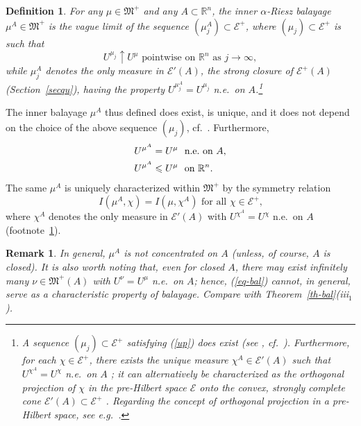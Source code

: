 \documentclass[12pt,a4paper,reqno]{amsart} %
\theoremstyle{lause}
\theoremstyle{maaritelma}
\theoremstyle{lause}
\theoremstyle{maaritelma}
\newtheorem{definition}[theorem]{Definition}
\newtheorem{remark}[theorem]{Remark}
\numberwithin{equation}{section}
\begin{document}
\begin{definition}\label{def-bal}
  For any $\mu\in\mathfrak M^+$ and any $A\subset\mathbb R^n$, {\it the inner $\alpha$-Riesz balayage} $\mu^A\in\mathfrak M^+$ is the vague limit of the sequence $(\mu_j^A)\subset\mathcal E^+$, where $(\mu_j)\subset\mathcal E^+$ is such that
  \begin{equation}\label{up}
  U^{\mu_j}\uparrow U^\mu\text{ \ pointwise on $\mathbb R^n$ as $j\to\infty$},
  \end{equation}
while $\mu_j^A$ denotes the only measure in $\mathcal E'(A)$, the strong closure of $\mathcal E^+(A)$ (Section~\ref{secqu}), having the property $U^{\mu_j^A}=U^{\mu_j}$ n.e.\ on $A$.\footnote{A sequence $(\mu_j)\subset\mathcal E^+$ satisfying (\ref{up}) does exist (see \cite[p.~272]{L}, cf.\ \cite[p.~257]{Ca2}). Furthermore, for each $\chi\in\mathcal E^+$, there exists the unique measure $\chi^A\in\mathcal E'(A)$ such that $U^{\chi^A}=U^\chi$ n.e.\ on $A$ \cite[Theorem~3.1(c)]{Z-arx-22}; it can alternatively be characterized as the orthogonal projection of $\chi$ in the pre-Hilbert space $\mathcal E$ onto the convex, strongly complete cone $\mathcal E'(A)\subset\mathcal E^+$ \cite[Theorem~3.1(b)]{Z-arx-22}. Regarding the concept of orthogonal projection in a pre-Hilbert space, see e.g.\ \cite[Theorem~1.12.3]{E2}.\label{F}}
\end{definition}

The inner balayage $\mu^A$ thus defined does exist, is unique, and it does not depend on the choice of the above sequence $(\mu_j)$, cf.\ \cite[Section~3.3]{Z-bal}. Furthermore,
\begin{align}
U^{\mu^A}&=U^\mu\text{ \ n.e.\ on $A$},\label{eq-bal}\\
U^{\mu^A}&\leqslant U^\mu\text{ \ on $\mathbb R^n$}.\notag
\end{align}
The same $\mu^A$ is uniquely characterized within $\mathfrak M^+$ by the symmetry relation
\[I(\mu^A,\chi)=I(\mu,\chi^A)\text{ \ for all $\chi\in\mathcal E^+$,}\]
where $\chi^A$ denotes the only measure in $\mathcal E'(A)$ with $U^{\chi^A}=U^{\chi}$ n.e.\ on $A$ (footnote~\ref{F}).

\begin{remark}
In general, $\mu^A$ is {\it not\/} concentrated on $A$ (unless, of course, $A$ is closed). It is also worth noting that, even for closed $A$, there may exist infinitely many $\nu\in\mathfrak M^+(A)$ with $U^\nu=U^\mu$ n.e.\ on $A$; hence, (\ref{eq-bal}) {\it cannot}, in general, serve as a characteristic property of balayage. Compare with Theorem~\ref{th-bal}(iii$_1$).
\end{remark}
\end{document}

